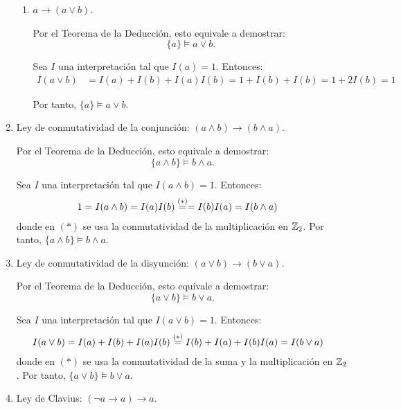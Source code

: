 \begin{ejercicio}
\begin{enumerate}
\begin{enumerate}
            \item $a \rightarrow (a\lor b)$.
            
            Por el Teorema de la Deducción, esto equivale a demostrar:
            \begin{equation*}
                \{a\} \models a\lor b.
            \end{equation*}

            Sea $I$ una interpretación tal que $I(a) = 1$. Entonces:
            \begin{align*}
                I(a\lor b) &= I(a) + I(b) + I(a)I(b) = 1 + I(b) + I(b) = 1 + 2I(b) = 1
            \end{align*}

            Por tanto, $\{a\} \models a\lor b$.
        \end{enumerate}
        
        \item Ley de conmutatividad de la conjunción: $(a\land b) \rightarrow (b\land a)$.
        
        Por el Teorema de la Deducción, esto equivale a demostrar:
        \begin{equation*}
            \{a\land b\} \models b\land a.
        \end{equation*}

        Sea $I$ una interpretación tal que $I(a\land b) = 1$. Entonces:
        \begin{align*}
            1=I(a\land b) &= I(a)I(b)\stackrel{(\ast)}{=} = I(b)I(a)=I(b\land a)
        \end{align*}
        donde en $(\ast)$ se usa la conmutatividad de la multiplicación en $\mathbb{Z}_2$. Por tanto, $\{a\land b\} \models b\land a$.
        \item Ley de conmutatividad de la disyunción: $(a\lor b) \rightarrow (b\lor a)$.
        
        Por el Teorema de la Deducción, esto equivale a demostrar:
        \begin{equation*}
            \{a\lor b\} \models b\lor a.
        \end{equation*}

        Sea $I$ una interpretación tal que $I(a\lor b) = 1$. Entonces:
        \begin{align*}
            I(a\lor b) &= I(a) + I(b) + I(a)I(b) \stackrel{(\ast)}{=} I(b) + I(a) + I(b)I(a) = I(b\lor a)
        \end{align*}
        donde en $(\ast)$ se usa la conmutatividad de la suma y la multiplicación en $\mathbb{Z}_2$. Por tanto, $\{a\lor b\} \models b\lor a$.
        \item Ley de Clavius: $(\neg a \rightarrow a) \rightarrow a$.
        

\end{enumerate}
\end{ejercicio}
